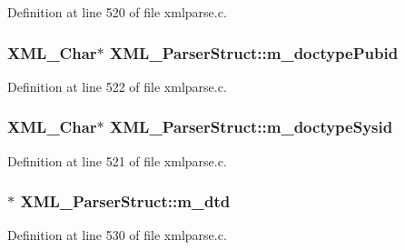 Definition at line 520 of file xmlparse.\+c.

\subsubsection[{\texorpdfstring{m\+\_\+doctype\+Pubid}{m_doctypePubid}}]{ {\bf X\+M\+L\+\_\+\+Char}$\ast$ X\+M\+L\+\_\+\+Parser\+Struct\+::m\+\_\+doctype\+Pubid}\hypertarget{struct_x_m_l___parser_struct_af298e2c1c67d0b16a80788c634ffea67}{}\label{struct_x_m_l___parser_struct_af298e2c1c67d0b16a80788c634ffea67}


Definition at line 522 of file xmlparse.\+c.

\subsubsection[{\texorpdfstring{m\+\_\+doctype\+Sysid}{m_doctypeSysid}}]{ {\bf X\+M\+L\+\_\+\+Char}$\ast$ X\+M\+L\+\_\+\+Parser\+Struct\+::m\+\_\+doctype\+Sysid}\hypertarget{struct_x_m_l___parser_struct_ad33e53b6c386e6389f5508cbe02e7876}{}\label{struct_x_m_l___parser_struct_ad33e53b6c386e6389f5508cbe02e7876}


Definition at line 521 of file xmlparse.\+c.

\subsubsection[{\texorpdfstring{m\+\_\+dtd}{m_dtd}}]{$\ast$ X\+M\+L\+\_\+\+Parser\+Struct\+::m\+\_\+dtd}\hypertarget{struct_x_m_l___parser_struct_a65fc597092c641845a21c232fc32a846}{}\label{struct_x_m_l___parser_struct_a65fc597092c641845a21c232fc32a846}


Definition at line 530 of file xmlparse.\+c.

